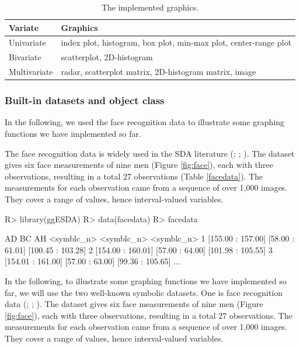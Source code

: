 \documentclass[article]{jss}
\begin{document}
\begin{table}[t!]
\centering
\begin{tabular}{|l|l|} \hline
Variate          & Graphics    \\ \hline
Univariate  & index plot, histogram, box plot, min-max plot, center-range plot \\ \hline
Bivariate & scatterplot, 2D-histogram \\ \hline
Multivariate & radar, scatterplot matrix, 2D-histogram matrix, image\\ \hline
\end{tabular}
\caption{\label{tab:graphics} The implemented graphics.}
\end{table}



\subsubsection{Built-in datasets and object class}
In the following, we used the face recognition
data to illustrate some graphing functions we have implemented so far.

The face recognition data is widely used in the SDA literature (\cite{leroy:1996}; \cite{douzal:2011}; \cite{le:2012}). The dataset gives six face measurements of nine
men (Figure \ref{fig:face}), each with three observations, resulting in a
total 27 observations (Table \ref{facedata}). The measurements for
each observation came from a sequence of over 1,000 images. They cover
a range of values, hence interval-valued variables.


\begin{CodeChunk}
\begin{CodeInput}
R> library(ggESDA)
R> data(facedata)
R> facedata
\end{CodeInput}
\begin{CodeOutput}
                 AD              BC                AH
         <symblc_n>      <symblc_n>        <symblc_n>
1 [155.00 : 157.00] [58.00 : 61.01] [100.45 : 103.28]
2 [154.00 : 160.01] [57.00 : 64.00] [101.98 : 105.55]
3 [154.01 : 161.00] [57.00 : 63.00]  [99.36 : 105.65]
...
\end{CodeOutput}
\end{CodeChunk}




In the following, to illustrate some graphing functions we have implemented so far, we will use the two well-known symbolic datasets. One is face recognition data (\cite{leroy:1996}; \cite{douzal:2011}; \cite{le:2012}). The dataset gives six face measurements of nine men (Figure \ref{fig:face}), each with three observations, resulting in a total 27 observations. The measurements for each observation came from a sequence of over 1,000 images. They cover a range of values, hence interval-valued variables. 
\end{document}
